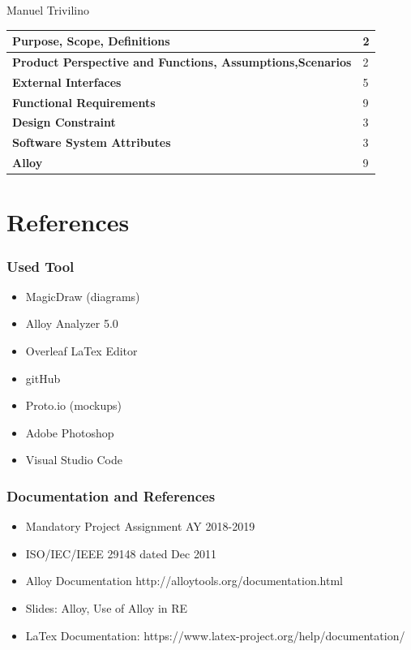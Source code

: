 \documentclass[a4paper]{article}
\begin{document}
\noindent Manuel Trivilino

    \begin{center}
\begin{tabular}{|l | l |}
    \hline \bf{Purpose, Scope, Definitions} & 2 \\ \hline
    \bf{Product Perspective and Functions, Assumptions,Scenarios}  & 2 \\ \hline
    \bf{External Interfaces} & 5 \\ \hline
    \bf{Functional Requirements} & 9 \\ \hline
    \bf{Design Constraint} & 3 \\ \hline
    \bf{Software System Attributes} & 3 \\ \hline
    \bf{Alloy} & 9 \\ \hline
\end{tabular}
\end{center}


\section{References}

\subsubsection{Used Tool}

\begin{itemize}
    \item MagicDraw (diagrams)
    \item Alloy Analyzer 5.0
    \item Overleaf LaTex Editor
    \item gitHub
    \item Proto.io (mockups)
    \item Adobe Photoshop
    \item Visual Studio Code
    
\end{itemize}

\subsubsection{Documentation and References}

\begin{itemize}
    \item Mandatory Project Assignment AY 2018-2019
    \item ISO/IEC/IEEE 29148 dated Dec 2011
    \item Alloy Documentation http://alloytools.org/documentation.html
    \item Slides: Alloy, Use of Alloy in RE
    \item LaTex Documentation: https://www.latex-project.org/help/documentation/
    
\end{itemize}
\end{document}
